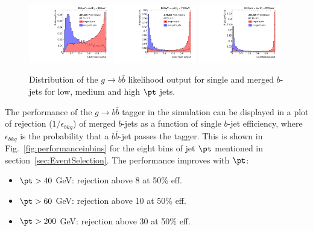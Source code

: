 \begin{figure}[tp]
\centering
\includegraphics[width=0.32\textwidth,viewport=40 0 540 550]{FIGS/Likelihood/NNoutput040_LihoodKDE.pdf}
\includegraphics[width=0.32\textwidth,viewport=40 0 540 550,clip]{FIGS/Likelihood/NNoutput080_LihoodKDE.pdf}
\includegraphics[width=0.32\textwidth,viewport=40 0 540 550,clip]{FIGS/Likelihood/NNoutput200_LihoodKDE.pdf}  
\caption{Distribution of the $g\rightarrow b \bar{b}$ likelihood output for single and merged $b$-jets for low, medium and high $\pt$ jets.}
\label{fig:outputinbins}
\end{figure}

The performance of the $g\rightarrow b \bar{b}$ tagger in the simulation can be  %
displayed in a plot of rejection ($1/\epsilon_{bkg}$) of merged $b$-jets as a function of single $b$-jet efficiency, where $\epsilon_{bkg}$ is the probability that a $b \bar{b}$-jet passes the tagger. This is shown in Fig.~\ref{fig:performanceinbins} for the eight bins of jet $\pt$ mentioned in section~\ref{sec:EventSelection}. The performance improves with $\pt$:


\begin{itemize}\addtolength{\itemsep}{-0.4\baselineskip}
\item
$\pt>40$ GeV: %
rejection above 8 at 50\% eff.
\item
$\pt>60$ GeV: %
rejection above 10 at 50\% eff.
\item
$\pt>200$ GeV: %
rejection above 30 at 50\% eff.
\end{itemize}


